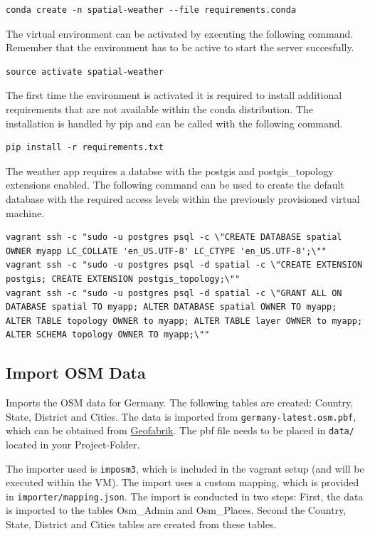 \documentclass[paper=a4, fontsize=11pt]{article} %
\numberwithin{equation}{section} %
\numberwithin{figure}{section} %
\numberwithin{table}{section} %
\begin{document}
\begin{lstlisting}
conda create -n spatial-weather --file requirements.conda
\end{lstlisting}

The virtual environment can be activated by executing the following command.
Remember that the environment has to be active to start the server succesfully.
\begin{lstlisting}
source activate spatial-weather
\end{lstlisting}

The first time the environment is activated it is required to install additional
requirements that are not available within the conda distribution. The installation
is handled by pip and can be called with the following command.
\begin{lstlisting}
pip install -r requirements.txt
\end{lstlisting}

The weather app requires a databse with the postgis and postgis\_topology extensions enabled.
The following command can be used to create the default database with the required
access levels within the previously provisioned virtual machine.
\begin{lstlisting}[breaklines=true]
vagrant ssh -c "sudo -u postgres psql -c \"CREATE DATABASE spatial OWNER myapp LC_COLLATE 'en_US.UTF-8' LC_CTYPE 'en_US.UTF-8';\""
vagrant ssh -c "sudo -u postgres psql -d spatial -c \"CREATE EXTENSION postgis; CREATE EXTENSION postgis_topology;\""
vagrant ssh -c "sudo -u postgres psql -d spatial -c \"GRANT ALL ON DATABASE spatial TO myapp; ALTER DATABASE spatial OWNER TO myapp; ALTER TABLE topology OWNER to myapp; ALTER TABLE layer OWNER to myapp; ALTER SCHEMA topology OWNER TO myapp;\""
\end{lstlisting}

\subsection{Import OSM Data}\label{import-osm-data}

Imports the OSM data for Germany. The following tables are created: Country, State, District and Cities. The data is imported from \texttt{germany-latest.osm.pbf}, which can be obtained from \href{http://download.geofabrik.de/europe/germany-latest.osm.pbf}{Geofabrik}. The pbf file needs to be placed in \texttt{data/} located in your Project-Folder.

The importer used is \texttt{imposm3}, which is included in the vagrant setup (and will be executed within the VM). The import uses a custom mapping, which is provided in \texttt{importer/mapping.json}. The import is conducted in two steps: First, the data is imported to the tables Osm\_Admin and Osm\_Places. Second the Country, State, District and Cities tables are created from these tables.
\end{document}
